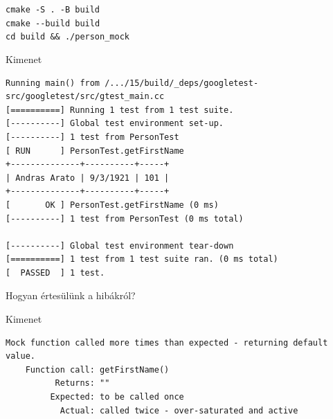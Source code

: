\documentclass[usenames,dvipsnames,aspectratio=169]{beamer}
\begin{document}
\begin{frame}[fragile]
    \texttt{cmake -S . -B build}\\
    \texttt{cmake -{-}build build}\\
    \texttt{cd build \&\& ./person\_mock}\\
    \begin{block}{Kimenet}
        \scriptsize
        \vspace{-.4cm}
        \begin{verbatim}
Running main() from /.../15/build/_deps/googletest-src/googletest/src/gtest_main.cc
[==========] Running 1 test from 1 test suite.
[----------] Global test environment set-up.
[----------] 1 test from PersonTest
[ RUN      ] PersonTest.getFirstName
+--------------+----------+-----+
| Andras Arato | 9/3/1921 | 101 |
+--------------+----------+-----+
[       OK ] PersonTest.getFirstName (0 ms)
[----------] 1 test from PersonTest (0 ms total)

[----------] Global test environment tear-down
[==========] 1 test from 1 test suite ran. (0 ms total)
[  PASSED  ] 1 test.
\end{verbatim}
        \vspace{-.4cm}
    \end{block}
\end{frame}

\begin{frame}[fragile]
    Hogyan értesülünk a hibákról?
    \begin{exampleblock}{}
        \footnotesize
        
    \end{exampleblock}
    \begin{block}{Kimenet}
        \vspace{-.4cm}
        \small
        \begin{verbatim}
Mock function called more times than expected - returning default value.
    Function call: getFirstName()
          Returns: ""
         Expected: to be called once
           Actual: called twice - over-saturated and active    
\end{verbatim}
        \vspace{-.4cm}
    \end{block}
\end{frame}
\end{document}
